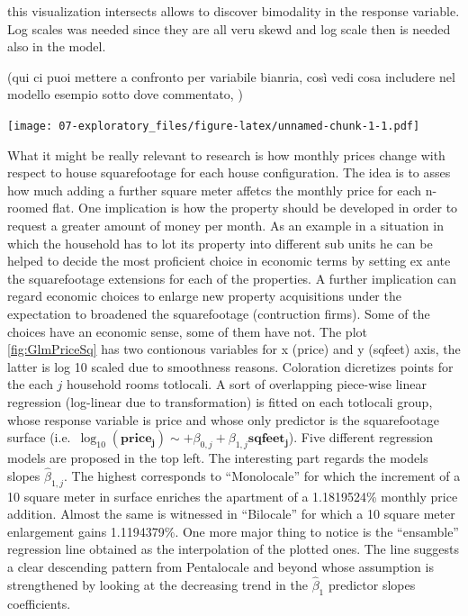 \documentclass[
  12pt,
  a4paper,
  oneside]{book}
\theoremstyle{definition}
\theoremstyle{definition}
\theoremstyle{definition}
\theoremstyle{remark}
\begin{document}
this visualization intersects allows to discover bimodality in the response variable. Log scales was needed since they are all veru skewd and log scale then is needed also in the model.

(qui ci puoi mettere a confronto per variabile bianria, così vedi cosa includere nel modello esempio sotto dove commentato, )

\texttt{[image: 07-exploratory\_files/figure-latex/unnamed-chunk-1-1.pdf]}

What it might be really relevant to research is how monthly prices change with respect to house squarefootage for each house configuration. The idea is to asses how much adding a further square meter affetcs the monthly price for each n-roomed flat.
One implication is how the property should be developed in order to request a greater amount of money per month. As an example in a situation in which the household has to lot its property into different sub units he can be helped to decide the most proficient choice in economic terms by setting ex ante the squarefootage extensions for each of the properties.
A further implication can regard economic choices to enlarge new property acquisitions under the expectation to broadened the squarefootage (contruction firms). Some of the choices have an economic sense, some of them have not.
The plot \ref{fig:GlmPriceSq} has two contionous variables for x (price) and y (sqfeet) axis, the latter is log 10 scaled due to smoothness reasons. Coloration dicretizes points for the each \(j\) household rooms totlocali. A sort of overlapping piece-wise linear regression (log-linear due to transformation) is fitted on each totlocali group, whose response variable is price and whose only predictor is the squarefootage surface (i.e.~\(\log_{10}(\mathbf{price_j}) \sim +\beta_{0,j}+\beta_{1,j}\mathbf{sqfeet_j}\)). Five different regression models are proposed in the top left. The interesting part regards the models slopes \(\hat\beta_{1,j}\). The highest corresponds to ``Monolocale'' for which the increment of a 10 square meter in surface enriches the apartment of a 1.1819524\% monthly price addition. Almost the same is witnessed in ``Bilocale'' for which a 10 square meter enlargement gains 1.1194379\%. One more major thing to notice is the ``ensamble'' regression line obtained as the interpolation of the plotted ones. The line suggests a clear descending pattern from Pentalocale and beyond whose assumption is strengthened by looking at the decreasing trend in the \(\hat\beta_1\) predictor slopes coefficients.
\end{document}
